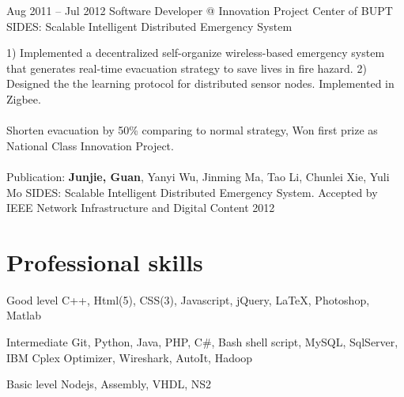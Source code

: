 \documentclass{tccv}
\begin{document}
\begin{eventlist}
    
    
    
    
    
    
    
    
    
    
    
    
    
   





\item{Aug 2011 -- Jul 2012}
     {Software Developer @ Innovation Project Center of BUPT}
     {SIDES: Scalable Intelligent Distributed Emergency System}
     
     1) Implemented a decentralized self-organize wireless-based emergency system that generates real-time evacuation strategy to save lives in fire hazard. 2) Designed the the learning protocol for distributed sensor nodes. Implemented in Zigbee.
\\\\
Shorten evacuation by 50\% comparing to normal strategy, Won first prize as National Class Innovation Project.
\\\\
Publication: \textbf{Junjie, Guan}, Yanyi Wu, Jinming Ma, Tao Li, Chunlei Xie, Yuli Mo SIDES: Scalable Intelligent Distributed Emergency System. Accepted by IEEE Network Infrastructure and Digital Content 2012
     
\end{eventlist}









































\if
\section{Professional skills}

\begin{factlist}

\item{Good level}
     {C++, Html(5), CSS(3), Javascript, jQuery, \LaTeX, Photoshop, Matlab}

\item{Intermediate}
     {Git, Python, Java, PHP, C\#, Bash shell script, MySQL, SqlServer, IBM Cplex Optimizer, Wireshark, AutoIt, Hadoop}

\item{Basic level}
     {Nodejs, Assembly, VHDL, NS2}

\end{factlist}

\fi
\end{document}
